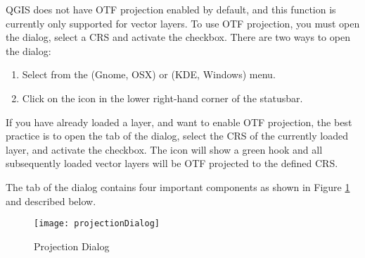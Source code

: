 QGIS does not have OTF projection enabled by default, and this function is
currently only supported for vector layers. To use OTF projection, you must
open the  dialog, select a
CRS and activate the  checkbox.
There are two ways to open the dialog:

\begin{enumerate}
\item Select  from the
 (Gnome, OSX) or  (KDE, Windows) menu.
\item Click on the  icon in the
lower right-hand corner of the statusbar.
\end{enumerate}

If you have already loaded a layer, and want to enable OTF projection, the
best practice is to open the  tab of the
 dialog, select the CRS of the currently loaded
layer, and activate the  checkbox. The
 icon will show a green hook
and all subsequently loaded vector layers will be OTF projected to the
defined CRS.
 
The  tab of the 
dialog contains four important components as shown in Figure
\ref{fig:projections} and described below.

\begin{figure}[ht]
   \centering
   \texttt{[image: projectionDialog]}   
   \caption{Projection Dialog \nixcaption}\label{fig:projections}
\end{figure}

